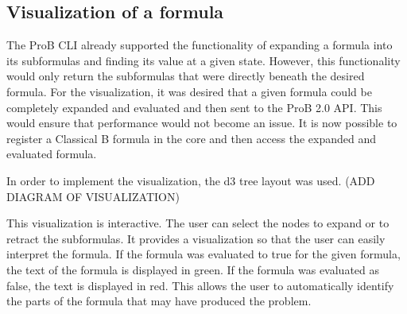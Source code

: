 \subsection{Visualization of a formula}

The ProB CLI already supported the functionality of expanding a formula into its subformulas and finding its value at a given state. However, this functionality would only return the subformulas that were directly beneath the desired formula. For the visualization, it was desired that a given formula could be completely expanded and evaluated and then sent to the ProB 2.0 API. This would ensure that performance would not become an issue. It is now possible to register a Classical B formula in the core and then access the expanded and evaluated formula.

In order to implement the visualization, the d3 tree layout was used. (ADD DIAGRAM OF VISUALIZATION)

This visualization is interactive. The user can select the nodes to expand or to retract the subformulas. It provides a visualization so that the user can easily interpret the formula. If the formula was evaluated to true for the given formula, the text of the formula is displayed in green. If the formula was evaluated as false, the text is displayed in red. This allows the user to automatically identify the parts of the formula that may have produced the problem. 